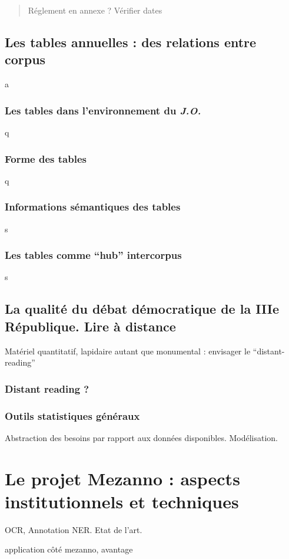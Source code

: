 \begin{quote} Réglement en annexe ? Vérifier dates\end{quote}
%
%	

\chapter{Les tables annuelles : des relations entre corpus}
a
\section{Les tables dans l'environnement du \textit{J.O.}}
q
\section{Forme des tables}
q
\section{Informations sémantiques des tables}
s
\section{Les tables comme \enquote{hub} intercorpus}
s

\chapter{La qualité du débat démocratique de la IIIe République. Lire à distance}
Matériel quantitatif, lapidaire autant que monumental : envisager le \enquote{distant-reading}
\section{Distant reading ?}
\section{Outils statistiques généraux}
Abstraction des besoins par rapport aux données disponibles. Modélisation.



\part{Le projet Mezanno : aspects institutionnels et techniques}
OCR, Annotation NER. Etat de l'art.

application côté mezanno, avantage

